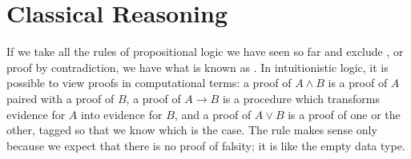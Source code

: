 \documentclass[letterpaper,10pt,english]{sphinxmanual}
\begin{document}
\begin{sphinxVerbatim}[commandchars=\\\{\}]
         

         

           

                    

             

       
\end{sphinxVerbatim}


\chapter{Classical Reasoning}
\label{\detokenize{classical_reasoning:classical-reasoning}}\label{\detokenize{classical_reasoning:id1}}\label{\detokenize{classical_reasoning::doc}}
\sphinxAtStartPar
If we take all the rules of propositional logic we have seen so far and exclude , or proof by contradiction, we have what is known as . In intuitionistic logic, it is possible to view proofs in computational terms: a proof of \(A \wedge B\) is a proof of \(A\) paired with a proof of \(B\), a proof of \(A \to B\) is a procedure which transforms evidence for \(A\) into evidence for \(B\), and a proof of \(A \vee B\) is a proof of one or the other, tagged so that we know which is the case. The  rule makes sense only because we expect that there is no proof of falsity; it is like the empty data type.
\end{document}

